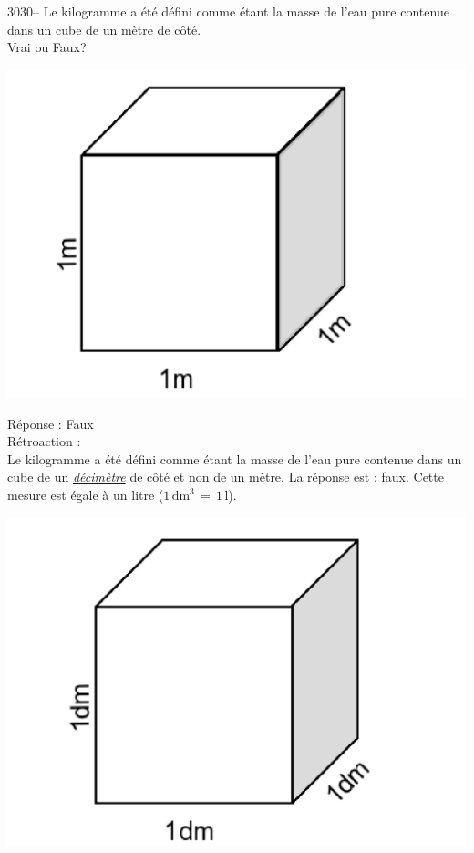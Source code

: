 \documentclass[letterpaper, 12pt]{article}
\begin{document}
3030-- Le kilogramme a \'et\'e d\'efini comme \'etant la masse de l'eau pure contenue dans un cube de un m\`etre de c\^ot\'e.\\
Vrai ou Faux?\\
\begin{center}
\includegraphics[scale=0.3]{cube.eps}
\end{center}

R\'eponse : Faux\\

R\'etroaction :\\
Le kilogramme a \'et\'e d\'efini comme \'etant la masse de l'eau pure contenue dans un cube de un \emph{\underline{d\'ecim\`etre}} de c\^ot\'e et non de un m\`etre. La r\'eponse est : faux. Cette mesure est \'egale \`a un litre ($1\,\text{dm}^{3}\,=\,1\,\text{l}$).\\

\begin{center}
\includegraphics[scale=0.3]{cubedm.eps}
\end{center}
\end{document}
